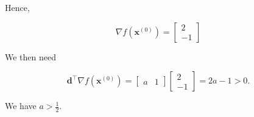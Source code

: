 Hence,

\begin{equation*}
	\nabla f\left(\boldsymbol{x}^{(0)}\right)=\left[\begin{array}{c}
		2 \\
		-1
	\end{array}\right]
\end{equation*}

We then need

\begin{equation*}
	\boldsymbol{d}^{\top} \nabla f\left(\boldsymbol{x}^{(0)}\right)=\left[\begin{array}{ll}
		a & 1
	\end{array}\right]\left[\begin{array}{c}
		2 \\
		-1
	\end{array}\right]=2 a-1>0 .
\end{equation*}

We have \(a>\frac{1}{2}\).
